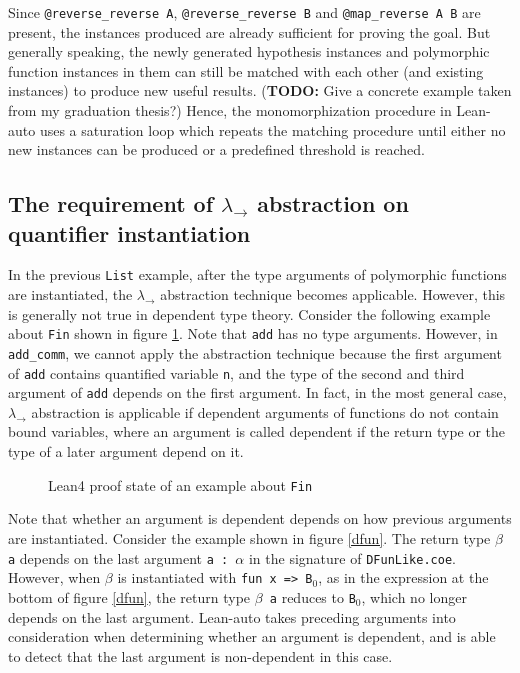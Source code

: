 Since \texttt{@reverse\_reverse A}, \texttt{@reverse\_reverse B} and \texttt{@map\_reverse A B}
are present, the instances produced are already sufficient for proving the goal.
But generally speaking, the newly generated hypothesis instances and polymorphic function instances
in them can still be matched with each other (and existing instances) to produce new useful results.
(\textbf{TODO:} Give a concrete example taken from my graduation thesis?)
Hence, the monomorphization procedure in Lean-auto uses a saturation loop which
repeats the matching procedure until either no new instances can be produced or a predefined
threshold is reached.

\subsection{The requirement of $\lambda_\to$ abstraction on quantifier instantiation} \label{exqdet}

In the previous \texttt{List} example, after the type arguments of polymorphic functions
are instantiated, the $\lambda_\to$ abstraction technique becomes applicable. However, this is
generally not true in dependent type theory. Consider the following example about \texttt{Fin} shown
in figure \ref{leanfinexplicit}. Note that \texttt{add} has no type arguments. However, in
\texttt{add\_comm}, we cannot apply the abstraction technique because the first argument of
\texttt{add} contains quantified variable \texttt{n}, and the type of the second and third argument
of \texttt{add} depends on the first argument. In fact, in the most general case, $\lambda_\to$
abstraction is applicable if dependent arguments of functions do not contain bound variables,
where an argument is called dependent if the return type or the type of a later argument depend on it.

\begin{figure}
  \begin{CenteredBox}
    
  \end{CenteredBox}
  \caption{Lean4 proof state of an example about \texttt{Fin}}
  \label{leanfinexplicit}
\end{figure}

Note that whether an argument is dependent depends on how previous arguments
are instantiated. Consider the example shown in figure \ref{dfun}. The return
type \texttt{$\beta$ a} depends on the last argument \texttt{a : $\alpha$} in the signature of
\texttt{DFunLike.coe}. However, when $\beta$ is instantiated with \texttt{fun x => B$_0$}, as in the
expression at the bottom of figure \ref{dfun}, the return type \texttt{$\beta$ a} reduces to \texttt{B$_0$},
which no longer depends on the last argument. Lean-auto takes preceding arguments into
consideration when determining whether an argument is dependent, and is able to detect
that the last argument is non-dependent in this case.

